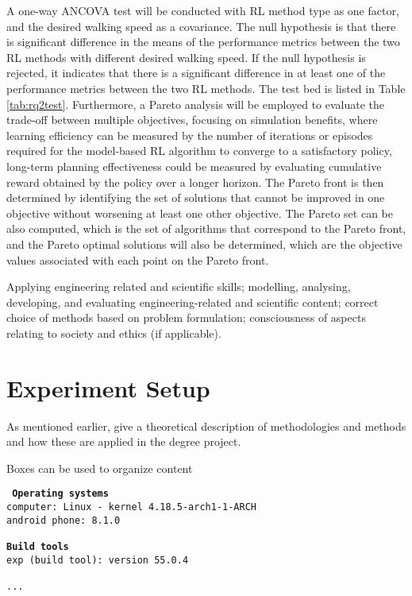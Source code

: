 A one-way ANCOVA test will be conducted with RL method type as one factor, and the desired walking speed as a covariance. The null hypothesis is that there is significant difference in the means of the performance metrics between the two RL methods with different desired walking speed. If the null hypothesis is rejected, it indicates that there is a significant difference in at least one of the performance metrics between the two RL methods. The test bed is listed in Table \ref{tab:rq2test}. Furthermore, a Pareto analysis will be employed to evaluate the trade-off between multiple objectives, focusing on simulation benefits, where learning efficiency can be measured by the number of iterations or episodes required for the model-based RL algorithm to converge to a satisfactory policy, long-term planning effectiveness could be measured by evaluating cumulative reward obtained by the policy over a longer horizon. The Pareto front is then determined by identifying the set of solutions that cannot be improved in one objective without worsening at least one other objective. The Pareto set can be also computed, which is the set of algorithms that correspond to the Pareto front, and the Pareto optimal solutions will also be determined, which are the objective values associated with each point on the Pareto front. 


Applying engineering related and scientific skills; modelling, analysing, developing, and evaluating engineering-related and scientific content; correct choice of methods based on problem formulation; consciousness of aspects relating to society and ethics (if applicable).

\section{Experiment Setup}


As mentioned earlier, give a theoretical description of methodologies and methods and how these are applied in the degree project.

Boxes can be used to organize content
\begin{tcolorbox}[title={Development environment for prototype}]
	\tt{
		\textbf{Operating systems }\\
		computer: Linux - kernel 4.18.5-arch1-1-ARCH\\
		android phone: 8.1.0\\
		~\\
		\textbf{Build tools}\\
		exp (build tool): version 55.0.4\\
		~\\
		...
	}
\end{tcolorbox}